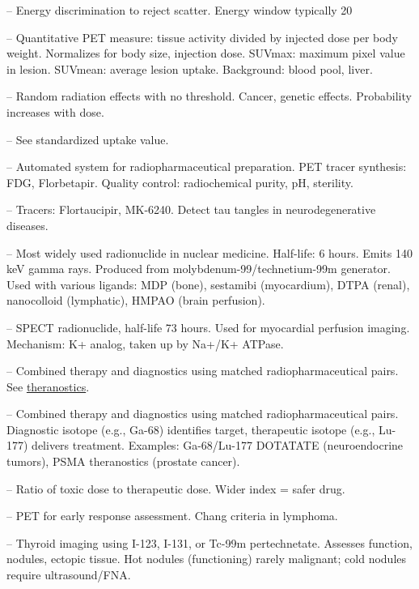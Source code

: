 -- Energy discrimination to reject scatter. Energy window typically 20%


-- Quantitative PET measure: tissue activity divided by injected dose per body weight. Normalizes for body size, injection dose. SUVmax: maximum pixel value in lesion. SUVmean: average lesion uptake. Background: blood pool, liver.

-- Random radiation effects with no threshold. Cancer, genetic effects. Probability increases with dose.

-- See standardized uptake value.

-- Automated system for radiopharmaceutical preparation. PET tracer synthesis: FDG, Florbetapir. Quality control: radiochemical purity, pH, sterility.

-- Tracers: Flortaucipir, MK-6240. Detect tau tangles in neurodegenerative diseases.

-- Most widely used radionuclide in nuclear medicine. Half-life: 6 hours. Emits 140 keV gamma rays. Produced from molybdenum-99/technetium-99m generator. Used with various ligands: MDP (bone), sestamibi (myocardium), DTPA (renal), nanocolloid (lymphatic), HMPAO (brain perfusion).

-- SPECT radionuclide, half-life 73 hours. Used for myocardial perfusion imaging. Mechanism: K+ analog, taken up by Na+/K+ ATPase.

-- Combined therapy and diagnostics using matched radiopharmaceutical pairs. See \hyperlink{Theranostics}{theranostics}.

-- Combined therapy and diagnostics using matched radiopharmaceutical pairs. Diagnostic isotope (e.g., Ga-68) identifies target, therapeutic isotope (e.g., Lu-177) delivers treatment. Examples: Ga-68/Lu-177 DOTATATE (neuroendocrine tumors), PSMA theranostics (prostate cancer).

-- Ratio of toxic dose to therapeutic dose. Wider index = safer drug.

-- PET for early response assessment. Chang criteria in lymphoma.

-- Thyroid imaging using I-123, I-131, or Tc-99m pertechnetate. Assesses function, nodules, ectopic tissue. Hot nodules (functioning) rarely malignant; cold nodules require ultrasound/FNA.


